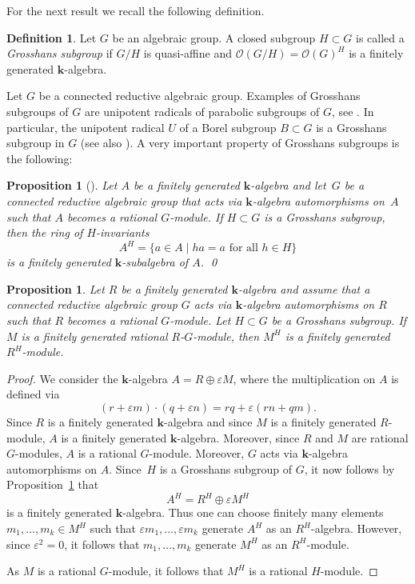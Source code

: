 \documentclass[11pt]{article}
\numberwithin{equation}{section}
\let\mathcal\mathscr
\theoremstyle{plain}
\newtheorem{proposition}[theorem]{Proposition}
\theoremstyle{definition}
\newtheorem{definition}[theorem]{Definition}
\newcommand{\OO}{\mathcal{O}}
\newcommand{\kk}{{\boldsymbol{k}}}
\newcommand{\set}[2]{\{#1 \mid #2\}}
\begin{document}
For the next result we recall the following definition.

\begin{definition}
Let $G$ be an algebraic group. A closed subgroup $H \subset G$
is called a \emph{Grosshans subgroup} if $G/H$ is quasi-affine and
$\OO(G/H) = \OO(G)^H$ is a finitely generated $\kk$-algebra.
\end{definition}

Let $G$ be a connected reductive algebraic group.
Examples of Grosshans subgroups of $G$ are unipotent radicals of parabolic
subgroups of $G$, see \cite[Th.\,16.4]{Gr1997Algebraic-homogene}.
In particular, the unipotent radical $U$ of a Borel subgroup
$B \subset G$ is a Grosshans subgroup in $G$
(see also \cite[Th.\,9.4]{Gr1997Algebraic-homogene}). A very important property of Grosshans subgroups is the following:

\begin{proposition}[{\cite[Th.\,9.3]{Gr1997Algebraic-homogene}}]
\label{prop:finite_generation_of_invariant}
Let $A$ be a finitely generated $\kk$-algebra and let~$G$
be a connected reductive algebraic group that acts via $\kk$-algebra automorphisms on~$A$
such that $A$ becomes a rational $G$-module.
If $H \subset G$ is a Grosshans subgroup, then the ring of $H$-invariants
\[
A^H = \set{a \in A}{\textrm{$h a = a$ for all $h \in H$}}
\]
is a finitely generated $\kk$-subalgebra of $A$. \qed
\end{proposition}

\begin{proposition}
\label{prop.MU_finitely_generated}
Let $R$ be a finitely generated $\kk$-algebra and assume
that a connected reductive algebraic group
$G$ acts via $\kk$-algebra automorphisms on $R$ such that
$R$ becomes a rational $G$-module. Let $H \subset G$ be a
Grosshans subgroup.
If $M$ is a finitely generated rational $R$-$G$-module,
then $M^H$ is a finitely generated $R^H$-module.
\end{proposition}

\begin{proof}
We consider the $\kk$-algebra $A = R \oplus \varepsilon M$, where the
multiplication on $A$ is defined via
\[
(r + \varepsilon m) \cdot (q + \varepsilon n) =
rq + \varepsilon (rn+qm).
\]
Since $R$ is a finitely generated $\kk$-algebra and since $M$
is a finitely generated $R$-module, $A$ is a finitely generated $\kk$-algebra.
Moreover, since $R$ and $M$ are rational $G$-modules,
$A$ is a rational $G$-module. Moreover,
$G$ acts via $\kk$-algebra automorphisms on $A$.
Since~$H$ is a Grosshans subgroup of $G$, it now follows
by Proposition~\ref{prop:finite_generation_of_invariant}
that
\[
A^H = R^H \oplus \varepsilon M^H
\]
is a finitely generated $\kk$-algebra. Thus one can choose
finitely many elements $m_1, \ldots, m_k \in M^H$
such that $\varepsilon m_1, \ldots, \varepsilon m_k$ generate $A^H$
as an $R^H$-algebra. However, since $\varepsilon^2 = 0$, it follows
that $m_1, \ldots, m_k$ generate $M^H$ as an $R^H$-module.

As $M$ is a rational $G$-module, it follows that $M^H$ is a rational $H$-module.
\end{proof}
\end{document}
